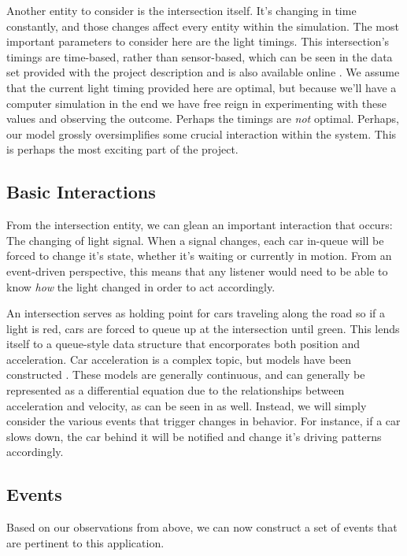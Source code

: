 \documentclass[a4paper,12pt]{article}
\begin{document}
Another entity to consider is the intersection itself. It's changing in time constantly, and those changes affect
every entity within the simulation. The most important parameters to consider here are the light timings. This
intersection's timings are time-based, rather than sensor-based, which can be seen in the data set provided with the
project description and is also available online \cite{ngsim}. We assume that the current light timing provided here
are optimal, but because we'll have a computer simulation in the end we have free reign in experimenting with these
values and observing the outcome. Perhaps the timings are \emph{not} optimal. Perhaps, our model grossly oversimplifies
some crucial interaction within the system. This is perhaps the most exciting part of the project.

\subsection{Basic Interactions}
From the intersection entity, we can glean an important interaction that occurs: The changing of light signal. When a
signal changes, each car in-queue will be forced to change it's state, whether it's waiting or currently in motion.
From an event-driven perspective, this means that any listener would need to be able to know \emph{how} the light
changed in order to act accordingly.

An intersection serves as holding point for cars traveling along the road so if a light is red, cars are forced to
queue up at the intersection until green. This lends itself to a queue-style data structure that encorporates both
position and acceleration. Car acceleration is a complex topic, but models have been constructed \cite{bonneson}
\cite{herman_et_al}. These models are generally continuous, and can generally be represented as a differential equation
due to the relationships between acceleration and velocity, as can be seen in \cite{briggs} \cite{deceleration} as well.
Instead, we will
simply consider the various events that trigger changes in behavior. For instance, if a car slows down, the car behind
it will be notified and change it's driving patterns accordingly.

\subsection{Events}
Based on our observations from above, we can now construct a set of events that are pertinent to this application.
\end{document}
